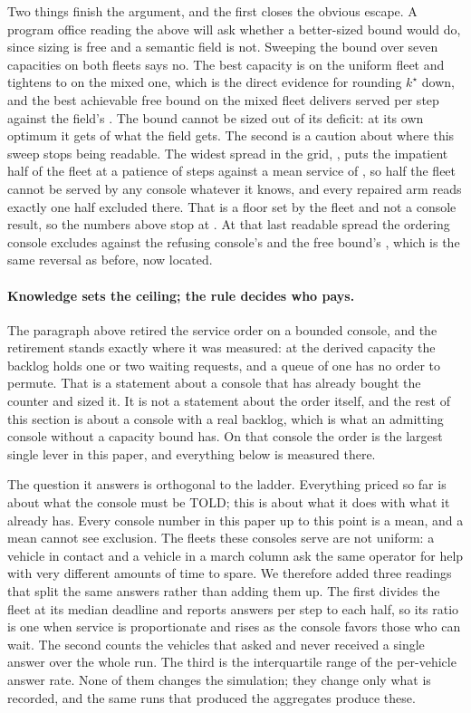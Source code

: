 \documentclass[11pt]{article}
\begin{document}
Two things finish the argument, and the first closes the obvious escape. A program office reading the above will ask whether a better-sized bound would do, since sizing is free and a semantic field is not. Sweeping the bound over seven capacities on both fleets says no. The best capacity is \LdKUniStar{} on the uniform fleet and tightens to \LdKMixStar{} on the mixed one, which is the direct evidence for rounding $k^{\star}$ down, and the best achievable free bound on the mixed fleet delivers \LdKMixBest{} served per step against the field's \LdHAdmitsSTwelve{}. The bound cannot be sized out of its deficit: at its own optimum it gets \LdKMixShortfall{} of what the field gets. The second is a caution about where this sweep stops being readable. The widest spread in the grid, \LdHCensorSpread{}, puts the impatient half of the fleet at a patience of \LdHCensorPat{} steps against a mean service of \LdHCensorSvc{}, so half the fleet cannot be served by any console whatever it knows, and every repaired arm reads exactly one half excluded there. That is a floor set by the fleet and not a console result, so the numbers above stop at \LdHLast{}. At that last readable spread the ordering console excludes \LdHExclOrderLast{} against the refusing console's \LdHExclFieldLast{} and the free bound's \LdHExclBoundLast{}, which is the same reversal as before, now located.
\paragraph{Knowledge sets the ceiling; the rule decides who pays.} The paragraph above retired the
service order on a bounded console, and the retirement stands exactly where it was measured: at the
derived capacity the backlog holds one or two waiting requests, and a queue of one has no order to
permute. That is a statement about a console that has already bought the counter and sized it. It is
not a statement about the order itself, and the rest of this section is about a console with a real
backlog, which is what an admitting console without a capacity bound has. On that console the order
is the largest single lever in this paper, and everything below is measured there.

The question it answers is orthogonal to the ladder. Everything priced so far is about what the
console must be TOLD; this is about what it does with what it already has. Every console number in
this paper up to this point is a mean, and a mean cannot see exclusion. The fleets these consoles
serve are not uniform: a vehicle in contact and a vehicle in a march column ask the same operator
for help with very different amounts of time to spare. We therefore added three readings that split
the same answers rather than adding them up. The first divides the fleet at its median deadline and
reports answers per step to each half, so its ratio is one when service is proportionate and rises as
the console favors those who can wait. The second counts the vehicles that asked and never received a
single answer over the whole run. The third is the interquartile range of the per-vehicle answer
rate. None of them changes the simulation; they change only what is recorded, and the same runs that
produced the aggregates produce these.
\end{document}
